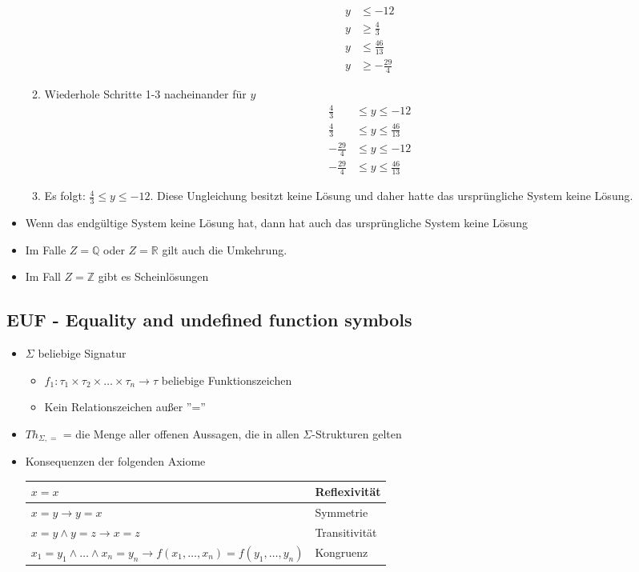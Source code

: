\documentclass{scrartcl}
\begin{document}
\begin{itemize}
\begin{enumerate}
\begin{align}
			y & \leq -12 \\
			y & \geq \frac{4}{3} \\
			y & \leq \frac{46}{13} \\
			y & \geq -\frac{29}{4}
		\end{align}
		\item Wiederhole Schritte 1-3 nacheinander für $ y $
		\setcounter{equation}{0}
		\begin{align}
			\frac{4}{3} & \leq y \leq -12 \\
			\frac{4}{3} & \leq y \leq \frac{46}{13} \\
			-\frac{29}{4} & \leq y \leq -12 \\
			-\frac{29}{4} & \leq y \leq \frac{46}{13}
		\end{align}
		\item Es folgt: $ \frac{4}{3} \leq y \leq -12 $. Diese Ungleichung besitzt keine Lösung und daher hatte das ursprüngliche System keine Lösung.
	\end{enumerate}
\end{itemize}

\begin{itemize}
	\item Wenn das endgültige System keine Lösung hat, dann hat auch das ursprüngliche System keine Lösung
	\item Im Falle $ Z = \mathbb{Q} $ oder $ Z = \mathbb{R} $ gilt auch die Umkehrung.
	\item Im Fall $ Z = \mathbb{Z} $ gibt es Scheinlösungen
\end{itemize}

\subsection{EUF - Equality and undefined function symbols}

\begin{itemize}
	\item $ \Sigma $ beliebige Signatur
	\begin{itemize}
		\item $ f_1 : \tau_1 \times \tau_2 \times \ldots \times \tau_n \rightarrow \tau $ beliebige Funktionszeichen
		\item Kein Relationszeichen außer ''=''
	\end{itemize}
	\item $ Th_{\Sigma,=} $ = die Menge aller offenen Aussagen, die in allen $ \Sigma $-Strukturen gelten
	\item Konsequenzen der folgenden Axiome \\
	\renewcommand{\arraystretch}{2}
	\begin{tabular}{l|l}
		$ x = x $ & Reflexivität \\ 
		\hline 
		$ x = y \rightarrow y = x $ & Symmetrie \\ 
		\hline 
		$ x = y \wedge y = z \rightarrow x = z $ & Transitivität \\ 
		\hline 
		$ x_1 = y_1 \wedge \ldots \wedge x_n = y_n \rightarrow f(x_1,\ldots,x_n) = f(y_1,\ldots,y_n) $ & Kongruenz \\ 
	\end{tabular} 
\end{itemize}
\end{document}
